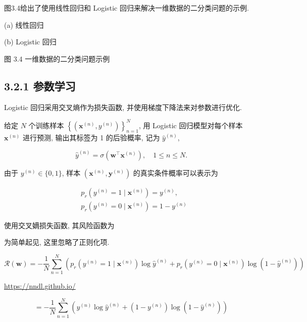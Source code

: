\documentclass[10pt]{article}
\begin{document}
图3.4给出了使用线性回归和 Logistic 回归来解决一维数据的二分类问题的示例.



(a) 线性回归



(b) Logistic 回归

图 3.4 一维数据的二分类问题示例

\subsection*{3.2.1 参数学习}
Logistic 回归采用交叉熵作为损失函数, 并使用梯度下降法来对参数进行优化.

给定 $N$ 个训练样本 $\left\{\left(\boldsymbol{x}^{(n)}, y^{(n)}\right)\right\}_{n=1}^{N}$, 用 Logistic 回归模型对每个样本 $\boldsymbol{x}^{(n)}$ 进行预测, 输出其标签为 1 的后验概率, 记为 $\hat{y}^{(n)}$,


\begin{equation*}
\hat{y}^{(n)}=\sigma\left(\boldsymbol{w}^{\top} \boldsymbol{x}^{(n)}\right), \quad 1 \leq n \leq N . \tag{3.19}
\end{equation*}


由于 $y^{(n)} \in\{0,1\}$, 样本 $\left(\boldsymbol{x}^{(n)}, \boldsymbol{y}^{(n)}\right)$ 的真实条件概率可以表示为


\begin{align*}
& p_{r}\left(y^{(n)}=1 \mid \boldsymbol{x}^{(n)}\right)=y^{(n)},  \tag{3.20}\\
& p_{r}\left(y^{(n)}=0 \mid \boldsymbol{x}^{(n)}\right)=1-y^{(n)} \tag{3.21}
\end{align*}


使用交叉嫡损失函数, 其风险函数为

为简单起见, 这里忽略了正则化项.


\begin{equation*}
\mathcal{R}(\boldsymbol{w})=-\frac{1}{N} \sum_{n=1}^{N}\left(p_{r}\left(y^{(n)}=1 \mid \boldsymbol{x}^{(n)}\right) \log \hat{y}^{(n)}+p_{r}\left(y^{(n)}=0 \mid \boldsymbol{x}^{(n)}\right) \log \left(1-\hat{y}^{(n)}\right)\right) \tag{3.22}
\end{equation*}


\href{https://nndl.github.io/}{https://nndl.github.io/}


\begin{equation*}
=-\frac{1}{N} \sum_{n=1}^{N}\left(y^{(n)} \log \hat{y}^{(n)}+\left(1-y^{(n)}\right) \log \left(1-\hat{y}^{(n)}\right)\right) \tag{3.23}
\end{equation*}
\end{document}
